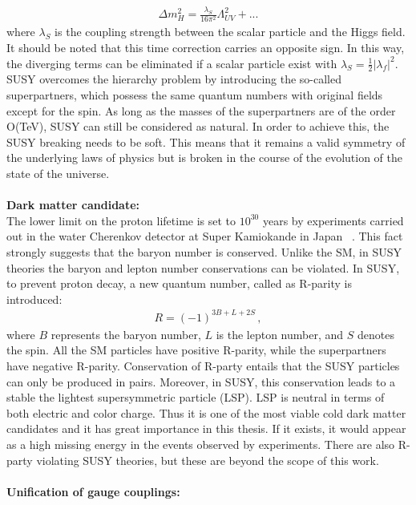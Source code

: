 \begin{eqnarray}
\label{deltaH2}
{\Delta m_H^2 =  \frac{\lambda_S}{16\pi^2}\Lambda_{UV}^2+...}
\end{eqnarray}
where $\lambda_S$ is the coupling strength between the scalar particle and the Higgs field. 
It should be noted that this time correction carries an opposite sign. In this way, the diverging terms can be eliminated if a scalar particle exist with $\lambda_S = \frac{1}{2}|\lambda_f|^2$.\\
SUSY overcomes the hierarchy problem by introducing the so-called superpartners, which possess the same quantum numbers with original fields except for the spin.
As long as the masses of the superpartners are of the order O(TeV), SUSY can still be considered as natural. In order to achieve  this, the SUSY breaking needs to be soft. This means that it remains a valid symmetry of the underlying laws of physics but is broken in the course of the evolution of the state of the universe.
\\
\\
\textbf{Dark matter candidate:}
\\
The lower limit on the proton lifetime is set to $10^{30}$ years by experiments carried out in the water Cherenkov detector at Super Kamiokande in Japan ~\cite{protonLifetime}. This fact strongly suggests that the baryon number is conserved.  Unlike the SM, in SUSY theories the baryon and lepton number conservations can be violated. In SUSY, to prevent proton decay, a new quantum number, called as R-parity is introduced: 
\begin{eqnarray}
\label{Rparity}
{R =  (-1)^{3B+L+2S}}\,,
\end{eqnarray}
where $B$ represents the baryon number, $L$ is the lepton number, and $S$ denotes the spin.
All the SM particles have positive R-parity, while the superpartners have negative R-parity. Conservation of R-party entails that the SUSY particles can only be produced in pairs. Moreover, in SUSY, this conservation leads to a stable the lightest supersymmetric particle (LSP).  LSP is neutral in terms of both electric and color charge. Thus it is one of the most viable cold dark matter candidates and it has great importance in this thesis. If it exists, it would appear as a high missing energy in the events observed by experiments.
There are also R-party violating SUSY theories, but these are beyond the scope of this work. 
\\
\\
\textbf{Unification of gauge couplings:}
\\
